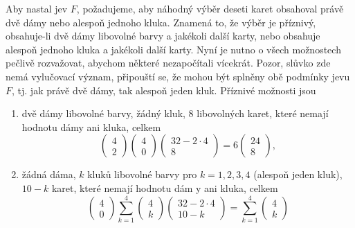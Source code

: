 \begin{example}
    Aby nastal jev \(F\), požadujeme, aby náhodný výběr deseti karet obsahoval právě dvě dámy nebo 
    alespoň jednoho kluka. Znamená to, že výběr je příznivý, obsahuje-li dvě dámy libovolné barvy a 
    jakékoli další karty, nebo obsahuje alespoň jednoho kluka a jakékoli další karty. Nyní je nutno 
    o všech možnostech pečlivě rozvažovat, abychom některé nezapočítali vícekrát. Pozor, slůvko 
     zde nemá vylučovací význam, připouští se, že mohou být splněny obě podmínky jevu 
    \(F\), tj. jak právě dvě dámy, tak alespoň jeden kluk. Příznivé možnosti jsou
    \begin{enumerate}
      \item dvě dámy libovolné barvy, žádný kluk, \num{8} libovolných karet, které nemají 
            hodnotu dámy ani kluka, celkem
            \begin{equation*}
              \begin{pmatrix} 4  \\ 2 \end{pmatrix}
              \begin{pmatrix} 4  \\ 0 \end{pmatrix}
              \begin{pmatrix} 32 - 2\cdot4 \\ 8 \end{pmatrix} = 6
              \begin{pmatrix} 24 \\ 8 \end{pmatrix},
            \end{equation*}
      \item žádná dáma, \(k\) kluků libovolné barvy pro \(k = 1, 2, 3, 4\) (alespoň jeden kluk), 
            \(10 - k\) karet, které nemají hodnotu dám y ani kluka, celkem
            \begin{equation*}
              \begin{pmatrix} 4  \\ 0 \end{pmatrix}
              \sum^{4}_{k=1}\begin{pmatrix} 4  \\ k \end{pmatrix}
                            \begin{pmatrix} 32 - 2\cdot4 \\ 10 - k \end{pmatrix} =
              \sum^{4}_{k=1}\begin{pmatrix} 4  \\ k \end{pmatrix}

\end{equation*}
\end{enumerate}
\end{example}
